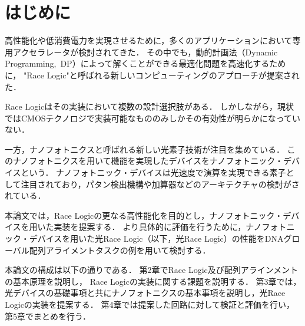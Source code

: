 \chapter{はじめに}
高性能化や低消費電力を実現させるために，多くのアプリケーションにおいて専用アクセラレータが検討されてきた．
その中でも，動的計画法（Dynamic Programming, DP）によって解くことができる最適化問題を高速化するために，
"Race Logic"と呼ばれる新しいコンピューティングのアプローチが提案された\cite{madhavan2014race}．

Race Logicはその実装において複数の設計選択肢がある．
しかしながら，現状ではCMOSテクノロジで実装可能なもののみしかその有効性が明らかになっていない．

一方，ナノフォトニクスと呼ばれる新しい光素子技術が注目を集めている．
このナノフォトニクスを用いて機能を実現したデバイスをナノフォトニック・デバイスという．
ナノフォトニック・デバイスは光速度で演算を実現できる素子として注目されており，パタン検出機構や加算器などのアーキテクチャの検討がされている．

本論文では，Race Logicの更なる高性能化を目的とし，ナノフォトニック・デバイスを用いた実装を提案する．
より具体的に評価を行うために，ナノフォトニック・デバイスを用いた光Race Logic（以下，光Race Logic）の性能をDNAグローバル配列アライメントタスクの例を用いて検討する．

本論文の構成は以下の通りである．
第2章でRace Logic及び配列アラインメントの基本原理を説明し，
Race Logicの実装に関する課題を説明する．
第3章では，光デバイスの基礎事項と共にナノフォトニクスの基本事項を説明し，光Race Logicの実装を提案する．
第4章では提案した回路に対して検証と評価を行い，第5章でまとめを行う．

